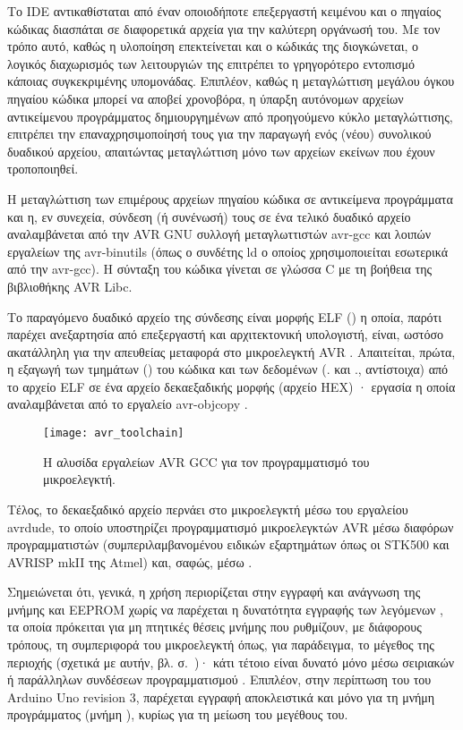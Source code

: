Το IDE αντικαθίσταται από έναν οποιοδήποτε επεξεργαστή κειμένου και ο πηγαίος
κώδικας διασπάται σε διαφορετικά αρχεία για την καλύτερη οργάνωσή του.
Με τον τρόπο αυτό, καθώς η υλοποίηση επεκτείνεται και ο κώδικάς της διογκώνεται,
ο λογικός διαχωρισμός των λειτουργιών της επιτρέπει το γρηγορότερο εντοπισμό
κάποιας συγκεκριμένης υπομονάδας. Επιπλέον, καθώς η μεταγλώττιση μεγάλου όγκου
πηγαίου κώδικα μπορεί να αποβεί χρονοβόρα, η ύπαρξη αυτόνομων αρχείων
αντικείμενου προγράμματος δημιουργημένων από προηγούμενο κύκλο μεταγλώττισης,
επιτρέπει την επαναχρησιμοποίησή τους για την παραγωγή ενός (νέου) συνολικού
δυαδικού αρχείου, απαιτώντας μεταγλώττιση μόνο των αρχείων εκείνων που έχουν
τροποποιηθεί.

Η μεταγλώττιση των επιμέρους αρχείων πηγαίου κώδικα σε αντικείμενα προγράμματα
και η, εν συνεχεία, σύνδεση (ή συνένωσή) τους σε ένα τελικό δυαδικό αρχείο
αναλαμβάνεται από την AVR GNU συλλογή μεταγλωττιστών avr-gcc και λοιπών
εργαλείων της avr-binutils (όπως ο συνδέτης ld ο οποίος χρησιμοποιείται
εσωτερικά από την avr-gcc). Η σύνταξη του κώδικα γίνεται σε γλώσσα C με τη
βοήθεια της βιβλιοθήκης AVR Libc.

Το παραγόμενο δυαδικό αρχείο της σύνδεσης είναι μορφής ELF () η οποία, παρότι παρέχει ανεξαρτησία από επεξεργαστή και
αρχιτεκτονική υπολογιστή, είναι, ωστόσο ακατάλληλη για την απευθείας μεταφορά
στο μικροελεγκτή AVR \parencites[47]{cruz97}[346]{avrlibc}. Απαιτείται, πρώτα, η
εξαγωγή των τμημάτων () του κώδικα και των δεδομένων (\@.
και \@., αντίστοιχα) από το αρχείο ELF σε ένα αρχείο δεκαεξαδικής
μορφής (αρχείο HEX) · εργασία η οποία αναλαμβάνεται από το εργαλείο avr-objcopy
\parencite[13,346]{avrlibc}.

\begin{figure}
    \caption{Η αλυσίδα εργαλείων AVR GCC για τον προγραμματισμό του
    μικροελεγκτή.\label{fig:avr:toolchain}}
    \begin{center}
    \texttt{[image: avr\_toolchain]}
    \end{center}
\end{figure}

Τέλος, το δεκαεξαδικό αρχείο περνάει στο μικροελεγκτή μέσω του εργαλείου
avrdude, το
οποίο υποστηρίζει προγραμματισμό μικροελεγκτών AVR μέσω διαφόρων προγραμματιστών
(συμπεριλαμβανομένου ειδικών εξαρτημάτων όπως οι STK500 και AVRISP mkII της
Atmel) και, σαφώς, μέσω  \parencites[15]{avrlibc}{avrdude}.

Σημειώνεται ότι, γενικά, η χρήση  περιορίζεται στην εγγραφή και
ανάγνωση της μνήμης  και EEPROM χωρίς να παρέχεται η δυνατότητα
εγγραφής των λεγόμενων , τα οποία πρόκειται για μη πτητικές θέσεις
μνήμης που ρυθμίζουν, με διάφορους τρόπους, τη συμπεριφορά του μικροελεγκτή
όπως, για παράδειγμα, το μέγεθος της περιοχής  (σχετικά με
αυτήν, βλ.  σ.~\pageref{subsec:avr:progmem})· κάτι
τέτοιο είναι δυνατό μόνο μέσω σειριακών ή παράλληλων συνδέσεων προγραμματισμού
\parencite[273]{atmel13}.  Επιπλέον, στην περίπτωση του  του
Arduino Uno revision 3, παρέχεται εγγραφή αποκλειστικά και μόνο για τη μνήμη
προγράμματος (μνήμη ), κυρίως για τη μείωση του μεγέθους του.


